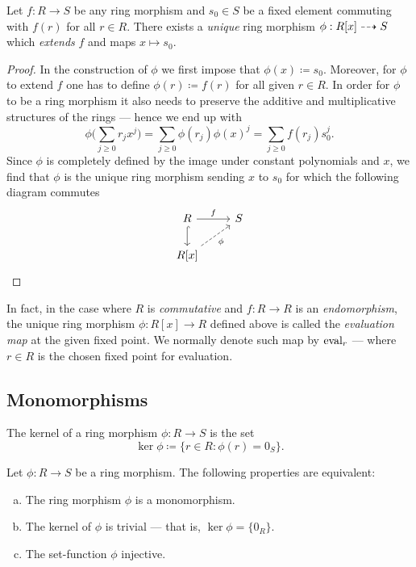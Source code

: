 %
\begin{proposition}
\label{prop:universal-property-polynomial-rings}
Let \(f: R \to S\) be any ring morphism and \(s_0 \in S\) be a fixed element
commuting with \(f(r)\) for all \(r \in R\). There exists a \emph{unique} ring
morphism \(\phi: R[x] \dashrightarrow S\) which \emph{extends} \(f\) and maps
\(x \mapsto s_0\).
\end{proposition}
%

%
\begin{proof}
In the construction of \(\phi\) we first impose that \(\phi(x) \coloneq
s_0\). Moreover, for \(\phi\) to extend \(f\) one has to define \(\phi(r)
\coloneq f(r)\) for all given \(r \in R\). In order for \(\phi\) to be a ring
morphism it also needs to preserve the additive and multiplicative structures of
the rings --- hence we end up with
\[
\phi\bigg( \sum_{j \geq 0} r_j x^j \bigg)
= \sum_{j \geq 0} \phi(r_j) \phi(x)^j
= \sum_{j \geq 0} f(r_j) s_0^j.
\]
Since \(\phi\) is completely defined by the image under constant polynomials and
\(x\), we find that \(\phi\) is the unique ring morphism sending \(x\) to
\(s_0\) for which the following diagram commutes
\[
\begin{tikzcd}
R \ar[d, hook] \ar[r, "f"]         & S \\
R[x] \ar[ru, dashed, swap, "\phi"] &
\end{tikzcd}
\]
\end{proof}
%

In fact, in the case where \(R\) is \emph{commutative} and \(f: R \to R\) is an
\emph{endomorphism}, the unique ring morphism \(\phi: R[x] \to R\) defined above
is called the \emph{evaluation map} at the given fixed point. We normally denote
such map by \(\operatorname{eval}_r\) --- where \(r \in R\) is the chosen fixed point for
evaluation.

\subsection{Monomorphisms}

%
\begin{definition}[Kernel]
\label{def:ring-morphism-kernel}
The kernel of a ring morphism \(\phi: R \to S\) is the set
\[
\ker \phi \coloneq \{r \in R \colon \phi(r) = 0_S\}.
\]
\end{definition}
%

%
\begin{proposition}
\label{prop:ring-kernel-monomorphism-injective}
Let \(\phi: R \to S\) be a ring morphism. The following properties are
equivalent:
\begin{enumerate}[(a)]\setlength\itemsep{0em}
\item The ring morphism \(\phi\) is a monomorphism.

\item The kernel of \(\phi\) is trivial --- that is, \(\ker \phi = \{0_R\}\).

\item The set-function \(\phi\) injective.
\end{enumerate}
\end{proposition}
%

